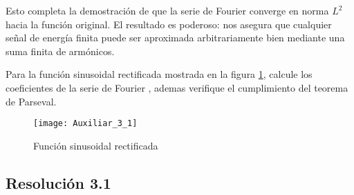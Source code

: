 \documentclass[
  11pt,
  letterpaper,
   addpoints,
   answers
  ]{exam}
\begin{document}
\begin{questions}
\begin{solution}
Esto completa la demostración de que la serie de Fourier converge en norma \(L^2\) hacia la función original. El resultado es poderoso: nos asegura que cualquier señal de energía finita puede ser aproximada arbitrariamente bien mediante una suma finita de armónicos.

\end{solution}
\question Para la función sinusoidal rectificada mostrada en la figura \ref{fig:aux3_1}, calcule los coeficientes de la serie de Fourier , ademas verifique el cumplimiento del teorema de Parseval.
\begin{figure}[H]
    \centering
    \texttt{[image: Auxiliar\_3\_1]}
    \caption{Función sinusoidal rectificada}
    \label{fig:aux3_1}
\end{figure}
\begin{solution}
  \subsection*{Resolución 3.1}


\end{solution}
\end{questions}
\end{document}

